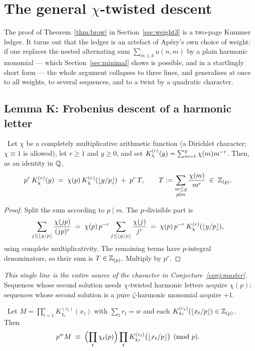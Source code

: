 \section{The general \texorpdfstring{$\chi$}{chi}-twisted descent}
\label{sec:general}

The proof of Theorem~\ref{thm:brow} in Section~\ref{sec:weight3} is a two-page Kummer
ledger. It turns out that the ledger is an artefact of Ap\'ery's own choice of weight: if
one replaces the nested alternating sum $\sum_{m\le k}u(n,m)$ by a plain harmonic monomial
--- which Section~\ref{sec:minimal} shows is possible, and in a startlingly short form ---
the whole argument collapses to three lines, and generalises at once to all weights, to
several sequences, and to a twist by a quadratic character.

\subsection{Lemma K: Frobenius descent of a harmonic letter}

\begin{lemma}[Lemma K]\label{lem:K}
\Proved\ Let $\chi$ be a completely multiplicative arithmetic function (a Dirichlet
character; $\chi\equiv1$ is allowed), let $r\ge1$ and $y\ge0$, and set
$K^{(r)}_{\chi}(y)=\sum_{m=1}^{y}\chi(m)m^{-r}$. Then, as an identity in $\mathbb{Q}$,
\[
   p^{r}\,K^{(r)}_{\chi}(y)\;=\;\chi(p)\,K^{(r)}_{\chi}(\lfloor y/p\rfloor)\;+\;p^{r}\,T,
   \qquad
   T:=\sum_{\substack{m\le y\\ p\nmid m}}\frac{\chi(m)}{m^{r}}\;\in\;\mathbb{Z}_{(p)} .
\]
\end{lemma}

\begin{proof}
Split the sum according to $p\mid m$. The $p$-divisible part is
\[
   \sum_{j\le\lfloor y/p\rfloor}\frac{\chi(jp)}{(jp)^{r}}
   \;=\;\chi(p)\,p^{-r}\sum_{j\le\lfloor y/p\rfloor}\frac{\chi(j)}{j^{r}}
   \;=\;\chi(p)\,p^{-r}\,K^{(r)}_{\chi}(\lfloor y/p\rfloor),
\]
using complete multiplicativity. The remaining terms have $p$-integral denominators, so
their sum is $T\in\mathbb{Z}_{(p)}$. Multiply by $p^r$.
\end{proof}

\emph{This single line is the entire source of the character in Conjecture~\ref{conj:master}.}
Sequences whose second solution needs $\chi$-twisted harmonic letters acquire $\chi(p)$;
sequences whose second solution is a pure $\zeta$-harmonic monomial acquire $+1$.

\begin{corollary}[Corollary K2]\label{cor:K2}
\Proved\ Let $M=\prod_{t=1}^{s}K^{(r_t)}_{\chi_t}(x_t)$ with $\sum_tr_t=w$ and each
$K^{(r_t)}_{\chi_t}(\lfloor x_t/p\rfloor)\in\mathbb{Z}_{(p)}$. Then
\[
   p^{w}M\;\equiv\;\Bigl(\prod_t\chi_t(p)\Bigr)\prod_tK^{(r_t)}_{\chi_t}
   \bigl(\lfloor x_t/p\rfloor\bigr)\pmod p .
\]
\end{corollary}

